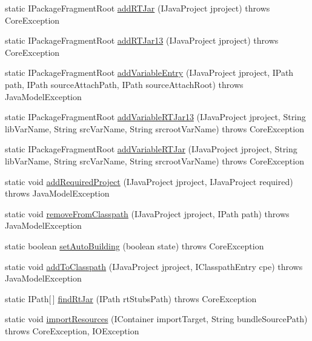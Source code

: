 \begin{DoxyCompactItemize}
\item 
static IPackageFragmentRoot \hyperlink{classorg_1_1eclipse_1_1jdt_1_1ui_1_1tests_1_1refactoring_1_1infra_1_1JavaProjectHelper_abb71254ee77bb408bcc8548cbff929d4}{addRTJar} (IJavaProject jproject)  throws CoreException 
\item 
static IPackageFragmentRoot \hyperlink{classorg_1_1eclipse_1_1jdt_1_1ui_1_1tests_1_1refactoring_1_1infra_1_1JavaProjectHelper_a5aa5a608ebe3f6166d0602cff8f0b287}{addRTJar13} (IJavaProject jproject)  throws CoreException 
\item 
static IPackageFragmentRoot \hyperlink{classorg_1_1eclipse_1_1jdt_1_1ui_1_1tests_1_1refactoring_1_1infra_1_1JavaProjectHelper_a7e6b8708c3654735401aada6361bf128}{addVariableEntry} (IJavaProject jproject, IPath path, IPath sourceAttachPath, IPath sourceAttachRoot)  throws JavaModelException 
\item 
static IPackageFragmentRoot \hyperlink{classorg_1_1eclipse_1_1jdt_1_1ui_1_1tests_1_1refactoring_1_1infra_1_1JavaProjectHelper_a252762e5a7a167af5ed1daef48c2b44f}{addVariableRTJar13} (IJavaProject jproject, String libVarName, String srcVarName, String srcrootVarName)  throws CoreException 
\item 
static IPackageFragmentRoot \hyperlink{classorg_1_1eclipse_1_1jdt_1_1ui_1_1tests_1_1refactoring_1_1infra_1_1JavaProjectHelper_af1d1929b81b3bfe9239d1fa08fd1be55}{addVariableRTJar} (IJavaProject jproject, String libVarName, String srcVarName, String srcrootVarName)  throws CoreException 
\item 
static void \hyperlink{classorg_1_1eclipse_1_1jdt_1_1ui_1_1tests_1_1refactoring_1_1infra_1_1JavaProjectHelper_a8a4fbd1681cc573e31464659185436a7}{addRequiredProject} (IJavaProject jproject, IJavaProject required)  throws JavaModelException 
\item 
static void \hyperlink{classorg_1_1eclipse_1_1jdt_1_1ui_1_1tests_1_1refactoring_1_1infra_1_1JavaProjectHelper_ab75bf11f00d22be3e81050263a30f7a1}{removeFromClasspath} (IJavaProject jproject, IPath path)  throws JavaModelException 
\item 
static boolean \hyperlink{classorg_1_1eclipse_1_1jdt_1_1ui_1_1tests_1_1refactoring_1_1infra_1_1JavaProjectHelper_aca056a0f02d0f464b7319c236786a30c}{setAutoBuilding} (boolean state)  throws CoreException 
\item 
static void \hyperlink{classorg_1_1eclipse_1_1jdt_1_1ui_1_1tests_1_1refactoring_1_1infra_1_1JavaProjectHelper_acb2cb3f2f31117a9663e43d3e5f2dea4}{addToClasspath} (IJavaProject jproject, IClasspathEntry cpe)  throws JavaModelException 
\item 
static IPath\mbox{[}$\,$\mbox{]} \hyperlink{classorg_1_1eclipse_1_1jdt_1_1ui_1_1tests_1_1refactoring_1_1infra_1_1JavaProjectHelper_ac1bceee3b24e6bfbc268488ab6a32b57}{findRtJar} (IPath rtStubsPath)  throws CoreException 
\item 
static void \hyperlink{classorg_1_1eclipse_1_1jdt_1_1ui_1_1tests_1_1refactoring_1_1infra_1_1JavaProjectHelper_a3fa084c31202066bae7e3139d5a47f41}{importResources} (IContainer importTarget, String bundleSourcePath)  throws CoreException, IOException 
\end{DoxyCompactItemize}
